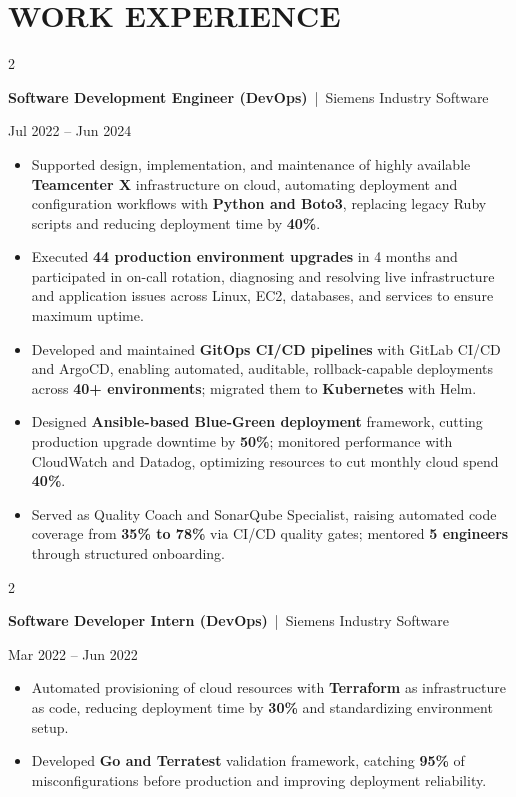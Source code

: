 \documentclass[10pt, letterpaper]{article}
\newenvironment{highlights}{
    \begin{itemize}[
        topsep=0.10 cm,
        parsep=0.06 cm,
        partopsep=0pt,
        itemsep=0.06 cm,
        leftmargin=12pt
    ]
}{
    \end{itemize}
}
\newenvironment{twocolentry}[2][]{
    \onecolentry
    \def\secondColumn{#2}
    \setcolumnwidth{\fill, 4.5 cm}
    \begin{paracol}{2}
}{
    \switchcolumn \raggedleft \secondColumn
    \end{paracol}
    \endonecolentry
}
\begin{document}
\section{WORK EXPERIENCE}
\begin{twocolentry}{Jul 2022 -- Jun 2024}
\textbf{Software Development Engineer (DevOps)} \,|\, Siemens Industry Software
\end{twocolentry}
\begin{highlights}
  \item Supported design, implementation, and maintenance of highly available \textbf{Teamcenter X} infrastructure on cloud, automating deployment and configuration workflows with \textbf{Python and Boto3}, replacing legacy Ruby scripts and reducing deployment time by \textbf{40\%}.
  \item Executed \textbf{44 production environment upgrades} in 4 months and participated in on-call rotation, diagnosing and resolving live infrastructure and application issues across Linux, EC2, databases, and services to ensure maximum uptime.
  \item Developed and maintained \textbf{GitOps CI/CD pipelines} with GitLab CI/CD and ArgoCD, enabling automated, auditable, rollback-capable deployments across \textbf{40+ environments}; migrated them to \textbf{Kubernetes} with Helm.
  \item Designed \textbf{Ansible-based Blue-Green deployment} framework, cutting production upgrade downtime by \textbf{50\%}; monitored performance with CloudWatch and Datadog, optimizing resources to cut monthly cloud spend \textbf{40\%}.
  \item Served as Quality Coach and SonarQube Specialist, raising automated code coverage from \textbf{35\% to 78\%} via CI/CD quality gates; mentored \textbf{5 engineers} through structured onboarding.
\end{highlights}

\vspace{0.15 cm}

\begin{twocolentry}{Mar 2022 -- Jun 2022}
\textbf{Software Developer Intern (DevOps)} \,|\, Siemens Industry Software
\end{twocolentry}
\begin{highlights}
  \item Automated provisioning of cloud resources with \textbf{Terraform} as infrastructure as code, reducing deployment time by \textbf{30\%} and standardizing environment setup.
  \item Developed \textbf{Go and Terratest} validation framework, catching \textbf{95\%} of misconfigurations before production and improving deployment reliability.
\end{highlights}
\end{document}
